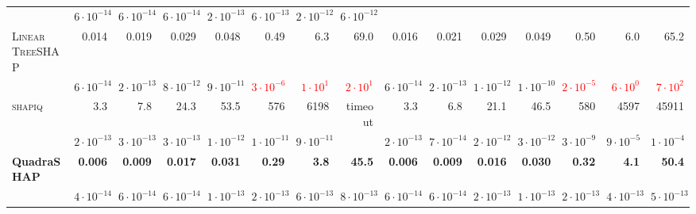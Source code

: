 \documentclass{article}
\begin{document}
\begin{table}[t]
\begin{tabular}{@{}lrrrrrrr@{\hspace{5pt}}rrrrrrr@{}}
  & {\scriptsize $6{\cdot}10^{-14}$} & {\scriptsize $6{\cdot}10^{-14}$} & {\scriptsize $6{\cdot}10^{-14}$} & {\scriptsize $2{\cdot}10^{-13}$} & {\scriptsize $6{\cdot}10^{-13}$} & {\scriptsize $2{\cdot}10^{-12}$} & {\scriptsize $6{\cdot}10^{-12}$} \\[2pt]
\textsc{Linear TreeSHAP}
  & 0.014 & 0.019 & 0.029 & 0.048 & 0.49 & 6.3 & 69.0
  & 0.016 & 0.021 & 0.029 & 0.049 & 0.50 & 6.0 & 65.2 \\
  & {\scriptsize $6{\cdot}10^{-14}$} & {\scriptsize $2{\cdot}10^{-13}$} & {\scriptsize $8{\cdot}10^{-12}$} & {\scriptsize $9{\cdot}10^{-11}$} & {\scriptsize \textcolor{red}{$3{\cdot}10^{-6}$}} & {\scriptsize \textcolor{red}{$1{\cdot}10^{1}$}} & {\scriptsize \textcolor{red}{$2{\cdot}10^{1}$}}
  & {\scriptsize $6{\cdot}10^{-14}$} & {\scriptsize $2{\cdot}10^{-13}$} & {\scriptsize $1{\cdot}10^{-12}$} & {\scriptsize $1{\cdot}10^{-10}$} & {\scriptsize \textcolor{red}{$2{\cdot}10^{-5}$}} & {\scriptsize \textcolor{red}{$6{\cdot}10^{0}$}} & {\scriptsize \textcolor{red}{$7{\cdot}10^{2}$}} \\[2pt]
\textsc{shapiq}
  & 3.3 & 7.8 & 24.3 & 53.5 & 576 & 6198 & timeout
  & 3.3 & 6.8 & 21.1 & 46.5 & 580 & 4597 & 45911 \\
  & {\scriptsize $2{\cdot}10^{-13}$} & {\scriptsize $3{\cdot}10^{-13}$} & {\scriptsize $3{\cdot}10^{-13}$} & {\scriptsize $1{\cdot}10^{-12}$} & {\scriptsize $1{\cdot}10^{-11}$} & {\scriptsize $9{\cdot}10^{-11}$} & {}
  & {\scriptsize $2{\cdot}10^{-13}$} & {\scriptsize $7{\cdot}10^{-14}$} & {\scriptsize $2{\cdot}10^{-12}$} & {\scriptsize $3{\cdot}10^{-12}$} & {\scriptsize $3{\cdot}10^{-9}$} & {\scriptsize $9{\cdot}10^{-5}$} & {\scriptsize $1{\cdot}10^{-4}$} \\[2pt]
\textbf{QuadraSHAP}
  & \textbf{0.006} & \textbf{0.009} & \textbf{0.017} & \textbf{0.031} & \textbf{0.29} & \textbf{3.8} & \textbf{45.5}
  & \textbf{0.006} & \textbf{0.009} & \textbf{0.016} & \textbf{0.030} & \textbf{0.32} & \textbf{4.1} & \textbf{50.4} \\
  & {\scriptsize $4{\cdot}10^{-14}$} & {\scriptsize $6{\cdot}10^{-14}$} & {\scriptsize $6{\cdot}10^{-14}$} & {\scriptsize $1{\cdot}10^{-13}$} & {\scriptsize $2{\cdot}10^{-13}$} & {\scriptsize $6{\cdot}10^{-13}$} & {\scriptsize $8{\cdot}10^{-13}$}
  & {\scriptsize $6{\cdot}10^{-14}$} & {\scriptsize $6{\cdot}10^{-14}$} & {\scriptsize $2{\cdot}10^{-13}$} & {\scriptsize $1{\cdot}10^{-13}$} & {\scriptsize $2{\cdot}10^{-13}$} & {\scriptsize $4{\cdot}10^{-13}$} & {\scriptsize $5{\cdot}10^{-13}$} \\[2pt]
\bottomrule
\end{tabular}
\end{table}
\end{document}
